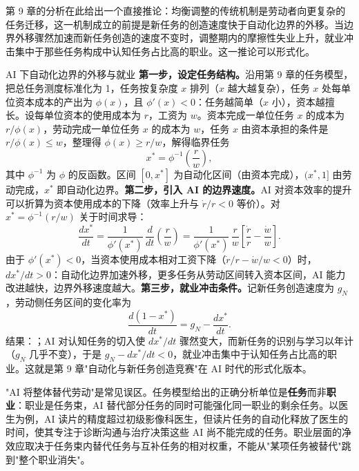 第 9 章的分析在此给出一个直接推论：均衡调整的传统机制是劳动者向更复杂的任务迁移，这一机制成立的前提是新任务的创造速度快于自动化边界的外移。当边界外移骤然加速而新任务创造的速度不变时，调整期内的摩擦性失业上升，就业冲击集中于那些任务构成中认知任务占比高的职业。这一推论可以形式化。

\begin{derivation}{AI 下自动化边界的外移与就业}{}
\textbf{第一步，设定任务结构。}沿用第 9 章的任务模型，把总任务测度标准化为 1，任务按复杂度 $x$ 排列（$x$ 越大越复杂），任务 $x$ 处每单位资本成本的产出为 $\phi(x)$，且 $\phi'(x) < 0$：任务越简单（$x$ 小），资本越擅长。设每单位资本的使用成本为 $r$，工资为 $w$。资本完成一单位任务 $x$ 的成本为 $r/\phi(x)$，劳动完成一单位任务 $x$ 的成本为 $w$，任务 $x$ 由资本承担的条件是 $r/\phi(x) \le w$，整理得 $\phi(x) \ge r/w$，解得临界任务
\[
x^* = \phi^{-1}\!\left(\frac{r}{w}\right),
\]
其中 $\phi^{-1}$ 为 $\phi$ 的反函数。区间 $[0, x^*]$ 为自动化区间（由资本完成），$(x^*, 1]$ 由劳动完成，$x^*$ 即自动化边界。\textbf{第二步，引入 AI 的边界速度。}AI 对资本效率的提升可以折算为资本使用成本的下降（效率上升与 $\dot r/r < 0$ 等价）。对 $x^* = \phi^{-1}(r/w)$ 关于时间求导：
\[
\frac{dx^*}{dt} = \frac{1}{\phi'(x^*)}\,\frac{d}{dt}\!\left(\frac{r}{w}\right)
= \frac{1}{\phi'(x^*)}\,\frac{r}{w}\left[\frac{\dot r}{r} - \frac{\dot w}{w}\right].
\]
由于 $\phi'(x^*) < 0$，当资本使用成本相对工资下降（$\dot r/r - \dot w/w < 0$）时，$dx^*/dt > 0$：自动化边界加速外移，更多任务从劳动区间转入资本区间，AI 能力改进越快，边界外移速度越大。\textbf{第三步，就业冲击条件。}记新任务创造速度为 $g_N$，劳动侧任务区间的变化率为
\[
\frac{d(1-x^*)}{dt} = g_N - \frac{dx^*}{dt}.
\]
结果：；AI 对认知任务的切入使 $dx^*/dt$ 骤然变大，而新任务的识别与学习以年计（$g_N$ 几乎不变），于是 $g_N - dx^*/dt < 0$，就业冲击集中于认知任务占比高的职业。这就是第 9 章"自动化与新任务创造竞赛"在 AI 时代的形式化版本。
\end{derivation}

\begin{misconception}
"AI 将整体替代劳动"是常见误区。任务模型给出的正确分析单位是\textbf{任务}而非\textbf{职业}：职业是任务束，AI 替代部分任务的同时可能强化同一职业的剩余任务。以医生为例，AI 读片的精度超过初级影像科医生，但读片任务的自动化释放了医生的时间，使其专注于诊断沟通与治疗决策这些 AI 尚不能完成的任务。职业层面的净效应取决于任务束内替代任务与互补任务的相对权重，不能从"某项任务被替代"跳到"整个职业消失"。
\end{misconception}

